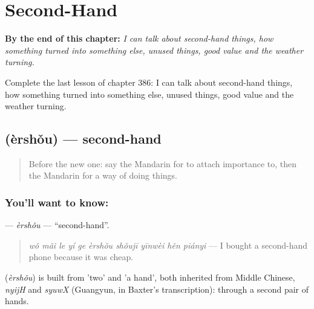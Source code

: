 
\chapter{Second-Hand}
\label{ch:zh-second-hand}

\begin{chapteropening}
\textbf{By the end of this chapter:} \emph{I can talk about second-hand things, how something turned into something else, unused things, good value and the weather turning.}

Complete the last lesson of chapter 386: I can talk about second-hand things, how something turned into something else, unused things, good value and the weather turning.
\end{chapteropening}

\section[\texorpdfstring{\zh{二手} (èrshǒu)}{二手 (èrshǒu)}]{ (èrshǒu) — second-hand}

\label{lesson:ZH-C386-ershou}



\begin{quote}
Before the new one: say the Mandarin for to attach importance to, then the Mandarin for a way of doing things.
\end{quote}

\subsection*{You'll want to know: }
\textbf{} — \emph{èrshǒu} — \textquotedblleft{}second-hand\textquotedblright{}.

\begin{quote}
\emph{wǒ mǎi le yí ge èrshǒu shǒujī yīnwèi hěn piányi} — I bought a second-hand phone because it was cheap.
\end{quote}

\begin{cousinweb}
\textbf{} (\emph{èrshǒu}) is built from  'two' and  'a hand', both inherited from Middle Chinese, \emph{nyijH} and \emph{syuwX} (Guangyun, in Baxter's transcription): through a second pair of hands.
\end{cousinweb}


